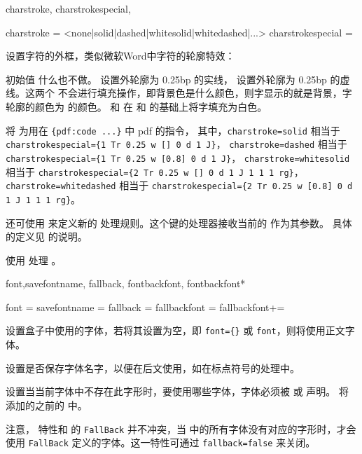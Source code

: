 \documentclass{ctxdoc}
\begin{document}
\begin{function}{
  charstroke,
  charstrokespecial,
  \zitiestrokechars
}
  \begin{syntax}
    charstroke = <none|solid|dashed|whitesolid|whitedashed|...> 
    charstrokespecial = 
      
  \end{syntax}
  设置字符的外框，类似微软Word中字符的轮廓特效：

  初始值  什么也不做。 设置外轮廓为 0.25bp 的实线， 设置外轮廓为 0.25bp 的虚线。这两个
  不会进行填充操作，即背景色是什么颜色，则字显示的就是背景，字轮廓的颜色为  的颜色。 和
   在  和  的基础上将字填充为白色。

   将  为用在 \verb|{pdf:code ...}| 中 pdf 的指令，
  其中，\verb|charstroke=solid| 相当于 \verb|charstrokespecial={1 Tr 0.25 w [] 0 d 1 J}|，
  \verb|charstroke=dashed| 相当于 \verb|charstrokespecial={1 Tr 0.25 w [0.8] 0 d 1 J}|，
  \verb|charstroke=whitesolid| 相当于 \verb|charstrokespecial={2 Tr 0.25 w [] 0 d 1 J 1 1 1 rg}|，
  \verb|charstroke=whitedashed| 相当于 \verb|charstrokespecial={2 Tr 0.25 w [0.8] 0 d 1 J 1 1 1 rg}|。

  还可使用  来定义新的  处理规则。这个键的处理器接收当前的  作为其参数。
  具体的定义见  的说明。

   使用  处理 。
\end{function}

\begin{function}{
  font,savefontname,
  fallback,
  fontbackfont,
  fontbackfont*
}
  \begin{syntax}
    font =  
    savefontname = \TTF {}
    fallback = \TTF {}
    fallbackfont = 
    fallbackfont+= 
  \end{syntax}
   设置盒子中使用的字体，若将其设置为空，即 \verb|font={}| 或 \verb|font|，则将使用正文字体。

   设置是否保存字体名字，以便在后文使用，如在标点符号的处理中。

   设置当当前字体中不存在此字形时，要使用哪些字体，字体必须被  或  声明。
   将  添加的之前的  中。

  注意， 特性和  的 \verb|FallBack| 并不冲突，当  中的所有字体没有对应的字形时，才会使用 \verb|FallBack| 定义的字体。这一特性可通过 \verb|fallback=false| 来关闭。
\end{function}
\end{document}
